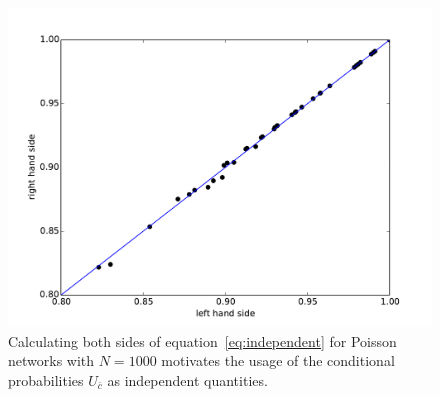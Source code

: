 \documentclass[aps, pre, onecolumn, a4paper, floatfix]{revtex4}
\begin{document}
\begin{figure}[htb]
\begin{center}
	\includegraphics[width=0.6\columnwidth]{finder_C_correlated.pdf}
	\caption{Calculating both sides of equation~\ref{eq:independent} for Poisson networks with $N=1000$ 
	motivates the usage of the conditional probabilities $U_{\bar c}$ as independent quantities.}
	\label{fig:corr}
\end{center}
\end{figure}




\end{document}
